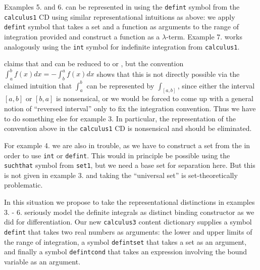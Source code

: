 \documentclass{llncs}
\begin{document}
Examples 5. and 6. can be represented in {\openmath} using the {\texttt{defint}} symbol
from the {\texttt{calculus1}} CD using similar representational intuitions as above: we
apply {\texttt{defint}} symbol that takes a set and a function as arguments to the range
of integration provided and construct a function as a $\lambda$-term. Example 7. works
analogously using the {\texttt{int}} symbol for indefinite integration from
{\texttt{calculus1}}.

{} claims that {} and {} can be reduced to
{} or {}, but the convention
$\int_a^bf(x)dx=-\int_b^af(x)dx$ shows that this is not directly possible via the claimed
intuition that $\int_a^b$ can be represented by $\int_{[a,b]}$, since either the interval
$[a,b]$ or $[b,a]$ is nonsensical, or we would be forced to come up with a general notion
of ``reversed interval'' only to fix the integration convention. Thus we have to do
something else for example 3. In particular, the {} representation of the
convention above in the {\texttt{calculus1}} CD is nonsensical and should be eliminated.

For example 4. we are also in trouble, as we have to construct a set from the
{} in order to use {\texttt{int}} or {\texttt{defint}}. This would in
principle be possible using the {\texttt{suchthat}} symbol from {\texttt{set1}}, but we
need a base set for separation here. But this is not given in example 3. and taking the
``universal set'' is set-theoretically problematic.

In this situation we propose to take the representational distinctions in examples 3. -
6. seriously model the definite integrals as distinct binding constructor as we did for
differentiation. Our new {\texttt{calculus3}} content dictionary supplies a symbol
{\texttt{defint}} that takes two real numbers as arguments: the lower and upper limits of
the range of integration, a symbol {\texttt{defintset}} that takes a set as an argument,
and finally a symbol {\texttt{defintcond}} that takes an expression involving the bound
variable as an argument. 
\end{document}
